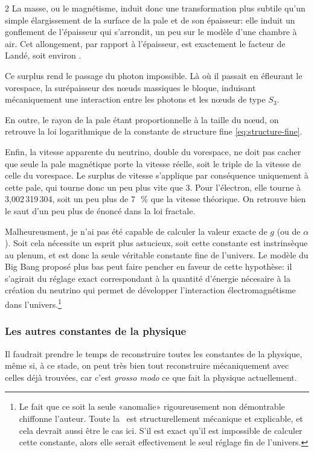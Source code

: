 \begin{multicols}{2}
La masse, ou le magnétisme, induit donc une transformation plus subtile qu'un simple élargissement de la surface de la pale et de son épaisseur: elle induit un gonflement de l'épaisseur qui s'arrondit, un peu sur le modèle d'une chambre à air. Cet allongement, par rapport à l'épaisseur, est exactement le facteur de Landé, soit environ .

Ce surplus rend le passage du photon impossible. Là où il passait en éfleurant le vorespace, la surépaisseur des nœuds massiques le bloque, induisant mécaniquement une interaction entre les photons et les nœuds de type $S_3$.

En outre, le rayon de la pale étant proportionnelle à la taille du nœud, on retrouve la loi logarithmique de la constante de structure fine \eqref{eq:structure-fine}.

Enfin, la vitesse apparente du neutrino, double du vorespace, ne doit pas cacher que seule la pale magnétique porte la vitesse réelle, soit le triple de la vitesse de celle du vorespace. Le surplus de vitesse s'applique par conséquence uniquement à cette pale, qui tourne donc un peu plus vite que 3. Pour l'électron, elle tourne à 3,002\,319\,304, soit un peu plus de 7\,~\% que la vitesse théorique. On retrouve bien le saut d'un peu plus de  énoncé dans la loi fractale.
\medskip

Malheureusment, je n'ai pas été capable de calculer la valeur exacte de $g$ (ou de $\alpha$). Soit cela nécessite un esprit plus astucieux, soit cette constante est instrinsèque au plenum, et est donc la seule véritable constante fine de l'univers. Le modèle du Big Bang proposé plus bas peut faire pencher en faveur de cette hypothèse: il s'agirait du réglage exact correspondant à la quantité d'énergie nécesaire à la création du neutrino qui permet de développer l'interaction électromagnétisme dans l'univers.\footnote{Le fait que ce soit la seule «anomalie» rigoureusement non démontrable  chiffonne l'auteur. Toute la \PQ\ est structurellement mécanique et explicable, et cela devrait  aussi être  le cas ici. S'il est exact qu'il est impossible de calculer cette constante, alors elle serait effectivement le seul réglage fin de l'univers.}

\subsubsection{Les autres constantes de la physique}

Il faudrait prendre le temps de reconstruire toutes les constantes de
la physique, même si, à ce stade, on peut très bien tout reconstruire
mécaniquement avec celles déjà trouvées, car c'est \textit{grosso modo} ce que
fait la physique actuellement.


\end{multicols}
